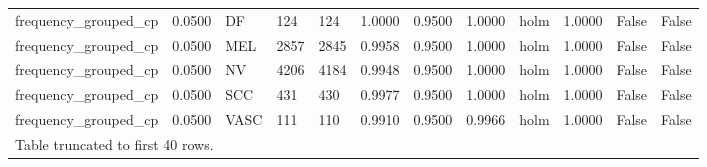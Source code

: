 \begin{table}[htbp]
\begin{tabular}{llllllllllll}
frequency\_grouped\_cp & 0.0500 & DF & 124 & 124 & 1.0000 & 0.9500 & 1.0000 & holm & 1.0000 & False & False \\
frequency\_grouped\_cp & 0.0500 & MEL & 2857 & 2845 & 0.9958 & 0.9500 & 1.0000 & holm & 1.0000 & False & False \\
frequency\_grouped\_cp & 0.0500 & NV & 4206 & 4184 & 0.9948 & 0.9500 & 1.0000 & holm & 1.0000 & False & False \\
frequency\_grouped\_cp & 0.0500 & SCC & 431 & 430 & 0.9977 & 0.9500 & 1.0000 & holm & 1.0000 & False & False \\
frequency\_grouped\_cp & 0.0500 & VASC & 111 & 110 & 0.9910 & 0.9500 & 0.9966 & holm & 1.0000 & False & False \\
\multicolumn{12}{l}{Table truncated to first 40 rows.} \\
\hline
\end{tabular}
\end{table}
